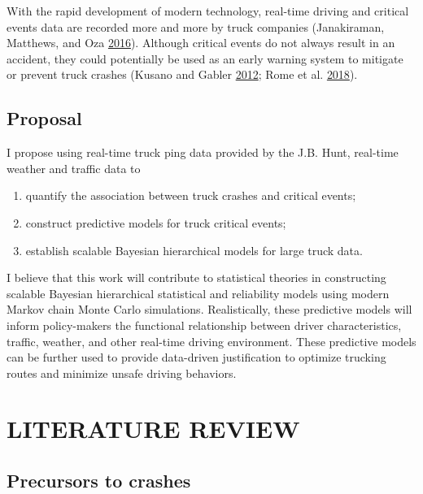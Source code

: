 \documentclass[12pt]{book}
\numberwithin{equation}{chapter}
\providecommand{\tightlist}{%
  \setlength{\itemsep}{0pt}\setlength{\parskip}{0pt}}
\begin{document}
With the rapid development of modern technology, real-time driving and critical events data are recorded more and more by truck companies (Janakiraman, Matthews, and Oza \protect\hyperlink{ref-janakiraman2016discovery}{2016}). Although critical events do not always result in an accident, they could potentially be used as an early warning system to mitigate or prevent truck crashes (Kusano and Gabler \protect\hyperlink{ref-kusano2012safety}{2012}; Rome et al. \protect\hyperlink{ref-de2018near}{2018}).

\hypertarget{proposal}{%
\section{Proposal}\label{proposal}}

I propose using real-time truck ping data provided by the J.B. Hunt, real-time weather and traffic data to

\begin{enumerate}
\def\labelenumi{\arabic{enumi})}
\tightlist
\item
  quantify the association between truck crashes and critical events;
\item
  construct predictive models for truck critical events;
\item
  establish scalable Bayesian hierarchical models for large truck data.
\end{enumerate}

I believe that this work will contribute to statistical theories in constructing scalable Bayesian hierarchical statistical and reliability models using modern Markov chain Monte Carlo simulations. Realistically, these predictive models will inform policy-makers the functional relationship between driver characteristics, traffic, weather, and other real-time driving environment. These predictive models can be further used to provide data-driven justification to optimize trucking routes and minimize unsafe driving behaviors.

\hypertarget{literature-review}{%
\chapter{LITERATURE REVIEW}\label{literature-review}}

\hypertarget{precursors-to-crashes}{%
\section{Precursors to crashes}\label{precursors-to-crashes}}
\end{document}
